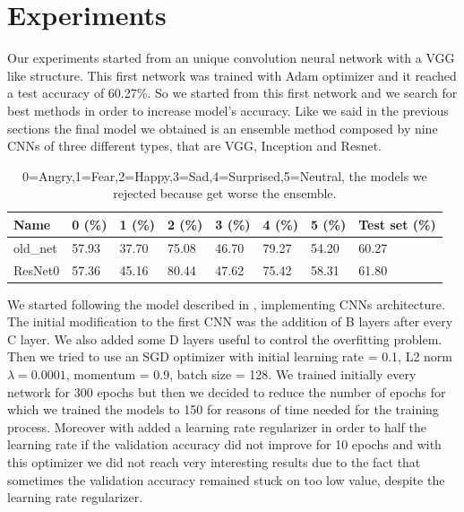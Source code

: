 \documentclass[10pt,twocolumn,letterpaper]{article}
\begin{document}
\section{Experiments}
\label{section:experiments}
Our experiments started from an unique convolution neural network with a VGG like structure. This first network was trained with Adam optimizer and it reached a test accuracy of 60.27\%. So we started from this first network and we search for best methods in order to increase model's accuracy. Like we said in the previous sections the final model we obtained is an ensemble method composed by nine CNNs of three different types, that are VGG, Inception and Resnet.
\def\arraystretch{1.2}
\begin{table}[H]
   \scriptsize
   \begin{tabular}{L{1.1cm}C{0.5cm}C{0.5cm}C{0.5cm}C{0.5cm}C{0.5cm}C{0.5cm}C{0.8cm}}
      \hline
      Name     & 0 (\%) & 1 (\%) & 2 (\%) & 3 (\%) & 4 (\%) & 5 (\%) & Test set (\%) \\
      \hline\hline
      old\_net & 57.93  & 37.70  & 75.08  & 46.70  & 79.27  & 54.20  & 60.27         \\
      ResNet0  & 57.36  & 45.16  & 80.44  & 47.62  & 75.42  & 58.31  & 61.80         \\
      \hline
   \end{tabular}
   \caption{ 0=Angry,1=Fear,2=Happy,3=Sad,4=Surprised,5=Neutral, the models we rejected because get worse the ensemble.}
   \label{table:accuracymodelli}
\end{table}
We started following the model described in \cite{147}, implementing CNNs architecture.\\
The initial modification to the first CNN was the addition of B layers after every C layer. We also added some D layers useful to control the overfitting problem. Then we tried to use an SGD optimizer with initial learning rate = 0.1, L2 norm $\lambda=0.0001$, momentum = 0.9, batch size = 128. We trained initially every network for 300 epochs but then we decided to reduce the number of epochs for which we trained the models to 150 for reasons of time needed for the training process.
Moreover with added a learning rate regularizer in order to half the learning rate if the validation accuracy did not improve for 10 epochs and with this optimizer we did not reach very interesting results due to the fact that sometimes the validation accuracy remained stuck on too low value, despite the learning rate regularizer. \\
\end{document}
